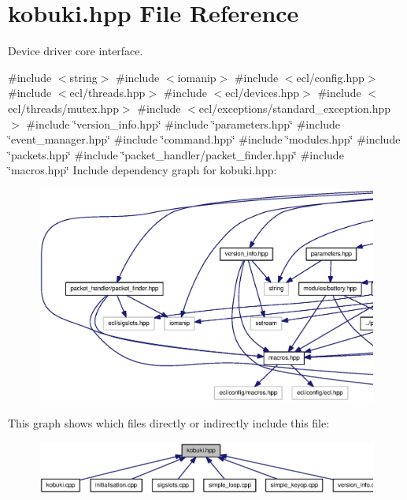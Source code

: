 \section{kobuki.\-hpp \-File \-Reference}
\label{kobuki_8hpp}


\-Device driver core interface.  


{\ttfamily \#include $<$string$>$}\*
{\ttfamily \#include $<$iomanip$>$}\*
{\ttfamily \#include $<$ecl/config.\-hpp$>$}\*
{\ttfamily \#include $<$ecl/threads.\-hpp$>$}\*
{\ttfamily \#include $<$ecl/devices.\-hpp$>$}\*
{\ttfamily \#include $<$ecl/threads/mutex.\-hpp$>$}\*
{\ttfamily \#include $<$ecl/exceptions/standard\-\_\-exception.\-hpp$>$}\*
{\ttfamily \#include \char`\"{}version\-\_\-info.\-hpp\char`\"{}}\*
{\ttfamily \#include \char`\"{}parameters.\-hpp\char`\"{}}\*
{\ttfamily \#include \char`\"{}event\-\_\-manager.\-hpp\char`\"{}}\*
{\ttfamily \#include \char`\"{}command.\-hpp\char`\"{}}\*
{\ttfamily \#include \char`\"{}modules.\-hpp\char`\"{}}\*
{\ttfamily \#include \char`\"{}packets.\-hpp\char`\"{}}\*
{\ttfamily \#include \char`\"{}packet\-\_\-handler/packet\-\_\-finder.\-hpp\char`\"{}}\*
{\ttfamily \#include \char`\"{}macros.\-hpp\char`\"{}}\*
\-Include dependency graph for kobuki.\-hpp\-:
\nopagebreak
\begin{figure}[H]
\begin{center}
\leavevmode
\includegraphics[width=350pt]{kobuki_8hpp__incl}
\end{center}
\end{figure}
\-This graph shows which files directly or indirectly include this file\-:
\nopagebreak
\begin{figure}[H]
\begin{center}
\leavevmode
\includegraphics[width=350pt]{kobuki_8hpp__dep__incl}
\end{center}
\end{figure}
